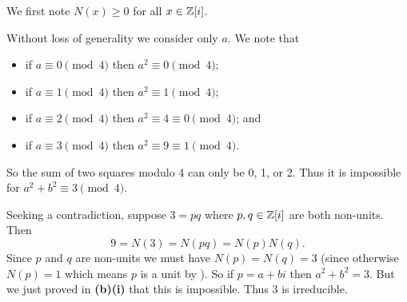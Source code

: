 \begin{questions}
\begin{partquestions}{\alph*}
        \item We first note $N(x) \geq 0$ for all $x \in \mathbb{Z}[i]$.
        \begin{partquestions}{\roman*}
            \item Without loss of generality we consider only $a$. We note that
            \begin{itemize}
                \item if $a \equiv 0 \pmod4$ then $a^2 \equiv 0 \pmod4$;
                \item if $a \equiv 1 \pmod4$ then $a^2 \equiv 1 \pmod4$;
                \item if $a \equiv 2 \pmod4$ then $a^2 \equiv 4 \equiv 0 \pmod4$; and
                \item if $a \equiv 3 \pmod4$ then $a^2 \equiv 9 \equiv 1 \pmod4$.
            \end{itemize}
            So the sum of two squares modulo 4 can only be 0, 1, or 2. Thus it is impossible for $a^2+b^2 \equiv 3\pmod4$.

            \item Seeking a contradiction, suppose $3 = pq$ where $p,q\in\mathbb{Z}[i]$ are both non-units. Then
            \[
                9 = N(3) = N(pq) = N(p)N(q).
            \]
            Since $p$ and $q$ are non-units we must have $N(p) = N(q) = 3$ (since otherwise $N(p) = 1$ which means $p$ is a unit by ). So if $p = a+bi$ then $a^2+b^2 = 3$. But we just proved in \textbf{(b)(i)} that this is impossible. Thus 3 is irreducible.


\end{partquestions}
\end{partquestions}
\end{questions}
